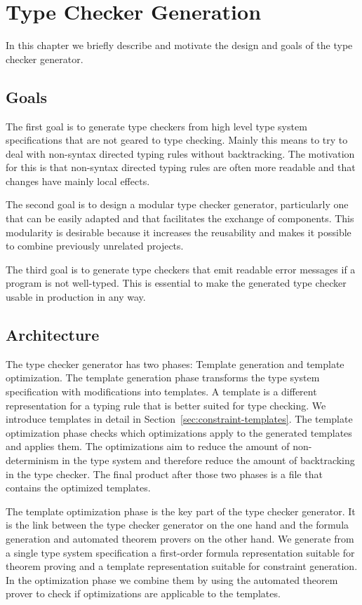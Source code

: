 \chapter{Type Checker Generation}
In this chapter we briefly describe and motivate the design and goals
of the type checker generator.

\section{Goals}
The first goal is to generate type checkers from high level type
system specifications that are not geared to type checking. Mainly
this means to try to deal with non-syntax directed typing rules
without backtracking. The motivation for this is that non-syntax
directed typing rules are often more readable and that changes have
mainly local effects. 

The second goal is to design a modular type checker generator,
particularly one that can be easily adapted and that facilitates the
exchange of components. This modularity is desirable because it
increases the reusability and makes it possible to combine previously
unrelated projects.

The third goal is to generate type checkers that emit readable error
messages if a program is not well-typed. This is essential to make the
generated type checker usable in production in any way.
\section{Architecture}
The type checker generator has two phases: Template generation and
template optimization. The template generation phase transforms the
type system specification with modifications into templates. A
template is a different representation for a typing rule that is
better suited for type checking. We introduce templates in detail in
Section~\ref{sec:constraint-templates}. The template optimization
phase checks which optimizations apply to the generated templates and
applies them. The optimizations aim to reduce the amount of
non-determinism in the type system and therefore reduce the amount of
backtracking in the type checker. The final product after those two
phases is a file that contains the optimized templates.

The template optimization phase is the key part of the type checker
generator. It is the link between the type checker generator on the
one hand and the formula generation and automated theorem provers on
the other hand. We generate from a single type system specification a
first-order formula representation suitable for theorem proving and a
template representation suitable for constraint generation. In the
optimization phase we combine them by using the automated theorem
prover to check if optimizations are applicable to the templates.

